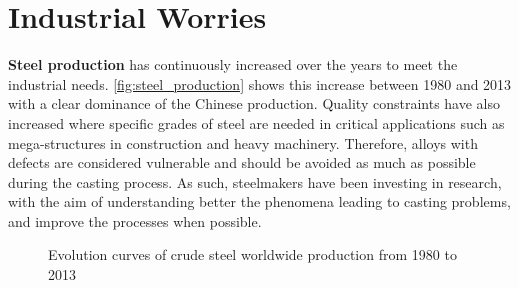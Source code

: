 \section{Industrial Worries}
\textbf{Steel production} has continuously increased over the years to meet the industrial needs. \autoref{fig:steel_production} shows this increase between 1980 and 2013 with a 
clear dominance of the Chinese production. Quality constraints have also increased where specific grades of steel are needed in critical applications such as mega-structures
in construction and  heavy machinery. Therefore, alloys with defects are considered vulnerable and should be avoided as much as possible during the casting process. As such, steelmakers have been investing
in research, with the aim of understanding better the phenomena leading to casting problems, and improve the processes when possible.

\begin{figure}[!h]
\centering
{}
\caption{Evolution curves of crude steel worldwide production from 1980 to 2013}
\label{fig:steel_production}
\end{figure}

